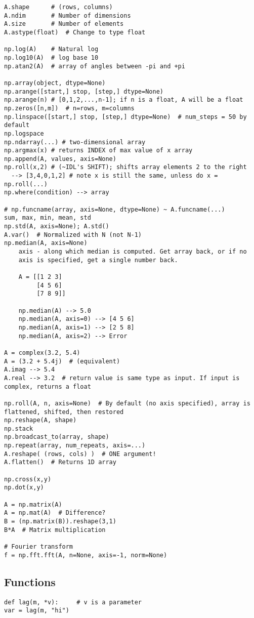 \documentclass{article}
\begin{document}
\begin{multicols}{2}
\begin{lstlisting}
A.shape      # (rows, columns)
A.ndim       # Number of dimensions
A.size       # Number of elements
A.astype(float)  # Change to type float

np.log(A)    # Natural log
np.log10(A)  # log base 10
np.atan2(A)  # array of angles between -pi and +pi

np.array(object, dtype=None)
np.arange([start,] stop, [step,] dtype=None)
np.arange(n) # [0,1,2,...,n-1]; if n is a float, A will be a float
np.zeros([n,m])  # n=rows, m=columns
np.linspace([start,] stop, [step,] dtype=None)  # num_steps = 50 by default
np.logspace
np.ndarray(...) # two-dimensional array
np.argmax(x) # returns INDEX of max value of x array
np.append(A, values, axis=None)
np.roll(x,2) # (~IDL's SHIFT); shifts array elements 2 to the right
  --> [3,4,0,1,2] # note x is still the same, unless do x = np.roll(...)
np.where(condition) --> array

# np.funcname(array, axis=None, dtype=None) ~ A.funcname(...)
sum, max, min, mean, std
np.std(A, axis=None); A.std()
A.var()  # Normalized with N (not N-1)
np.median(A, axis=None)
    axis - along which median is computed. Get array back, or if no
    axis is specified, get a single number back.

    A = [[1 2 3]
         [4 5 6]
         [7 8 9]]

    np.median(A) --> 5.0
    np.median(A, axis=0) --> [4 5 6]
    np.median(A, axis=1) --> [2 5 8]
    np.median(A, axis=2) --> Error

A = complex(3.2, 5.4)
A = (3.2 + 5.4j)  # (equivalent)
A.imag --> 5.4
A.real --> 3.2  # return value is same type as input. If input is complex, returns a float

np.roll(A, n, axis=None)  # By default (no axis specified), array is flattened, shifted, then restored
np.reshape(A, shape)
np.stack
np.broadcast_to(array, shape)
np.repeat(array, num_repeats, axis=...)
A.reshape( (rows, cols) )  # ONE argument!
A.flatten()  # Returns 1D array

np.cross(x,y)
np.dot(x,y)

A = np.matrix(A)
A = np.mat(A)  # Difference?
B = (np.matrix(B)).reshape(3,1)
B*A  # Matrix multiplication

# Fourier transform
f = np.fft.fft(A, n=None, axis=-1, norm=None)
\end{lstlisting}

\subsection{Functions}
\begin{lstlisting}
def lag(m, *v):     # v is a parameter
var = lag(m, "hi")


\end{lstlisting}
\end{multicols}
\end{document}
